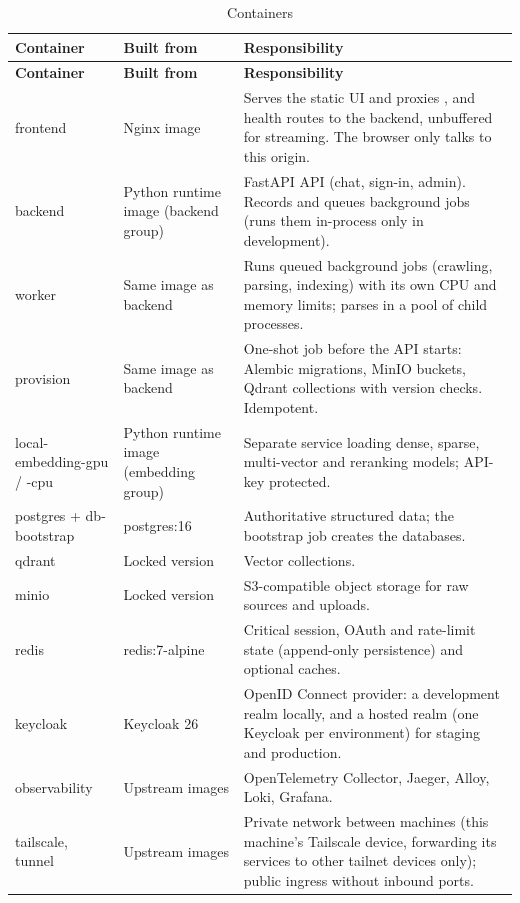 \documentclass[11pt,letterpaper]{report}
\begin{document}
\begin{longtable}{@{}P{3.2cm}P{3.4cm}P{8.8cm}@{}}
\caption{Containers}\label{tab:containers}\\
\toprule
\textbf{Container} & \textbf{Built from} & \textbf{Responsibility} \\
\midrule
\endfirsthead
\toprule
\textbf{Container} & \textbf{Built from} & \textbf{Responsibility} \\
\midrule
\endhead
frontend & Nginx image & Serves the static UI and proxies ,  and health routes to the backend, unbuffered for streaming. The browser only talks to this origin. \\
backend & Python runtime image (backend group) & FastAPI API (chat, sign-in, admin). Records and queues background jobs (runs them in-process only in development). \\
worker & Same image as backend & Runs queued background jobs (crawling, parsing, indexing) with its own CPU and memory limits; parses in a pool of child processes. \\
provision & Same image as backend & One-shot job before the API starts: Alembic migrations, MinIO buckets, Qdrant collections with version checks. Idempotent. \\
local-embedding-gpu / -cpu & Python runtime image (embedding group) & Separate service loading dense, sparse, multi-vector and reranking models; API-key protected. \\
postgres + db-bootstrap & postgres:16 & Authoritative structured data; the bootstrap job creates the databases. \\
qdrant & Locked version & Vector collections. \\
minio & Locked version & S3-compatible object storage for raw sources and uploads. \\
redis & redis:7-alpine & Critical session, OAuth and rate-limit state (append-only persistence) and optional caches. \\
keycloak & Keycloak 26 & OpenID Connect provider: a development realm locally, and a hosted realm (one Keycloak per environment) for staging and production. \\
observability & Upstream images & OpenTelemetry Collector, Jaeger, Alloy, Loki, Grafana. \\
tailscale, tunnel & Upstream images & Private network between machines (this machine's Tailscale device, forwarding its services to other tailnet devices only); public ingress without inbound ports. \\
\bottomrule
\end{longtable}
\end{document}
